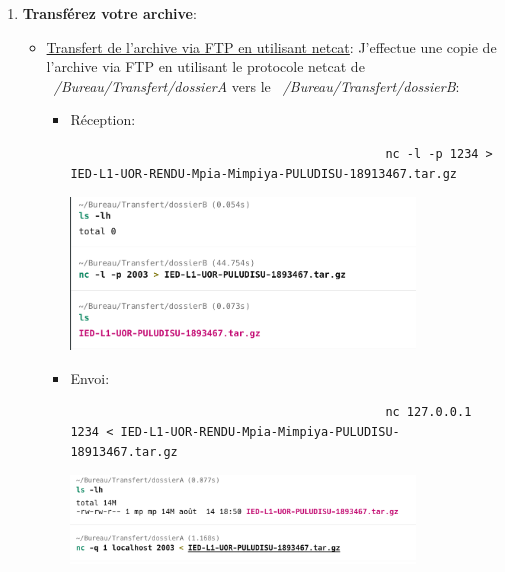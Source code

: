 \documentclass[a4paper,11pt]{article}
\begin{document}
\begin{enumerate}
                \item \textbf{Transférez votre archive}:
                    \begin{itemize}
                        \item \underline{Transfert de l'archive via FTP en utilisant netcat}:
                            \noindent J'effectue une copie de l'archive via FTP en utilisant le protocole netcat de \textit{~/Bureau/Transfert/dossierA}
                            vers le \textit{~/Bureau/Transfert/dossierB}:
                            \begin{itemize}
                                \item Réception: 
                                    \begin{tcolorbox}[colback=lightgray!6, colframe=black, left=-85mm, right=5mm, top=2mm, bottom=-2mm, boxrule=0.1mm]
                                        \begin{verbatim}
                                            nc -l -p 1234 > IED-L1-UOR-RENDU-Mpia-Mimpiya-PULUDISU-18913467.tar.gz
                                        \end{verbatim}
                                    \end{tcolorbox}
                                    \includegraphics[width=0.8\textwidth]{CHAPITRE-7/7.1-A-RENDRE/screenshots/screen4.png}
                                \item Envoi:
                                    \begin{tcolorbox}[colback=lightgray!6, colframe=black, left=-88mm, right=5mm, top=2mm, bottom=-2mm, boxrule=0.1mm]
                                        \begin{verbatim}
                                            nc 127.0.0.1 1234 < IED-L1-UOR-RENDU-Mpia-Mimpiya-PULUDISU-18913467.tar.gz
                                        \end{verbatim}
                                    \end{tcolorbox}
                                    \includegraphics[width=0.8\textwidth]{CHAPITRE-7/7.1-A-RENDRE/screenshots/screen3.png}
                            \end{itemize}


\end{itemize}
\end{enumerate}
\end{document}
